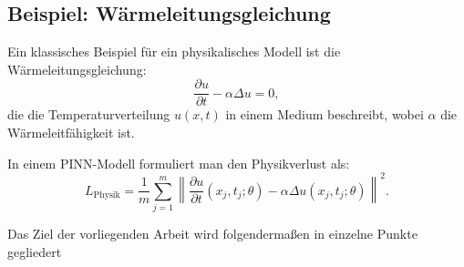 \subsection{Beispiel: Wärmeleitungsgleichung}
Ein klassisches Beispiel für ein physikalisches Modell ist die Wärmeleitungsgleichung:
\[
\frac{\partial u}{\partial t} - \alpha \Delta u = 0,
\]
die die Temperaturverteilung $u(x, t)$ in einem Medium beschreibt, wobei $\alpha$ die Wärmeleitfähigkeit ist. 

In einem PINN-Modell formuliert man den Physikverlust als:
\[
L_\text{Physik} = \frac{1}{m} \sum_{j=1}^m \left\|\frac{\partial u}{\partial t}(x_j, t_j; \theta) - \alpha \Delta u(x_j, t_j; \theta)\right\|^2.
\]



Das Ziel der vorliegenden Arbeit wird folgendermaßen in einzelne Punkte gegliedert

